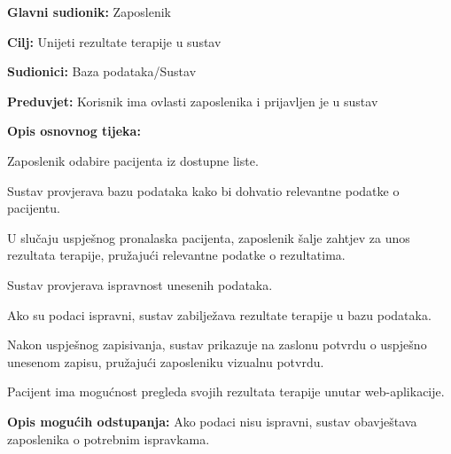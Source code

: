 \noindent {}
\begin{packed_item}
	
	\item \textbf{Glavni sudionik: }Zaposlenik
	\item  \textbf{Cilj:} Unijeti rezultate terapije u sustav
	\item  \textbf{Sudionici:} Baza podataka/Sustav
	\item  \textbf{Preduvjet:} Korisnik ima ovlasti zaposlenika i prijavljen je u sustav
	\item  \textbf{Opis osnovnog tijeka:}
	
	\item[] \begin{packed_enum}
		
		\item Zaposlenik odabire pacijenta iz dostupne liste.
		\item Sustav provjerava bazu podataka kako bi dohvatio relevantne podatke o pacijentu.
		\item U slučaju uspješnog pronalaska pacijenta, zaposlenik šalje zahtjev za unos rezultata terapije, pružajući relevantne podatke o rezultatima.
		\item Sustav provjerava ispravnost unesenih podataka.
		\item Ako su podaci ispravni, sustav zabilježava rezultate terapije u bazu podataka.
		\item Nakon uspješnog zapisivanja, sustav prikazuje na zaslonu potvrdu o uspješno unesenom zapisu, pružajući zaposleniku vizualnu potvrdu.
		\item Pacijent ima mogućnost pregleda svojih rezultata terapije unutar web-aplikacije.
		
	\end{packed_enum}
	
	\item  \textbf{Opis mogućih odstupanja:} Ako podaci nisu ispravni, sustav obavještava zaposlenika o potrebnim ispravkama.
	
	
\end{packed_item}

